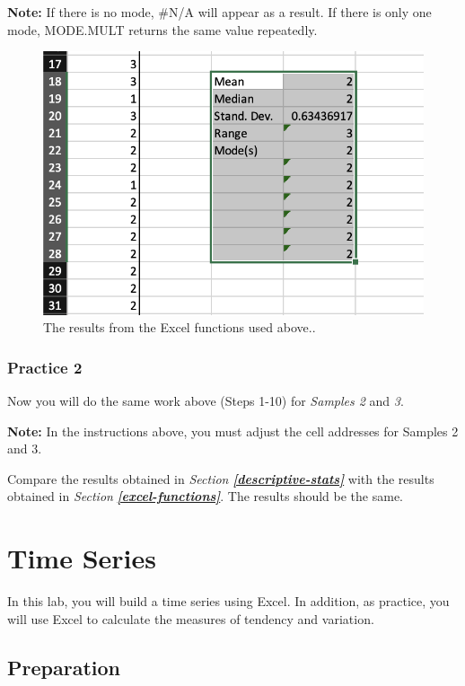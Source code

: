 \documentclass[
]{book}
\begin{document}
\textbf{Note:} If there is no mode, \#N/A will appear as a result. If there is only one mode, MODE.MULT returns the same value repeatedly.

\begin{figure}

{\centering \includegraphics[width=0.6\linewidth]{excel-functions} 

}

\caption{The results from the Excel functions used above..}\label{fig:excel-functions}
\end{figure}

\hypertarget{practice-2-2}{%
\subsection{Practice 2}\label{practice-2-2}}

Now you will do the same work above (Steps 1-10) for \emph{Samples 2} and \emph{3}.

\textbf{Note:} In the instructions above, you must adjust the cell addresses for Samples 2 and 3.

Compare the results obtained in \emph{Section} \textbf{\emph{\ref{descriptive-stats}}} with the results obtained in \emph{Section} \textbf{\emph{\ref{excel-functions}}}. The results should be the same.

\hypertarget{time-series}{%
\chapter{Time Series}\label{time-series}}

In this lab, you will build a time series using Excel. In addition, as practice, you will use Excel to calculate the measures of tendency and variation.

\hypertarget{preparation-2}{%
\section{Preparation}\label{preparation-2}}
\end{document}
